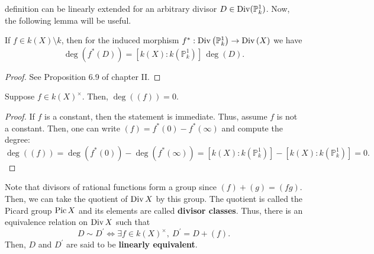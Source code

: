 definition can be linearly extended for an arbitrary divisor
$D\in\operatorname{Div}(\mathbb{P}^{1}_{k})$. Now, the following lemma will be useful.
\begin{lemm}\label{lemm:deg_of_induced}
  If $f\in k(X)\setminus k$, then for the induced morphism $f^{\ast}:\operatorname{Div}\left(
    \mathbb{P}^{1}_{k}\right)\to\operatorname{Div}\left(X\right)$ we have
  \[
    \deg\left(f^{\ast}(D)\right)=[k(X):k(\mathbb{P}^{1}_{k})]\,\deg(D).
  \]
\end{lemm}
\begin{proof} %
  See Proposition 6.9 of \cite{hartshorne} chapter II.
\end{proof}
\begin{cor}\label{cor:rational_deg_zero}
  Suppose $f\in k(X)^{\times}$. Then, $\deg\left((f)\right)=0$.
\end{cor}
\begin{proof}
  If $f$ is a constant, then the statement is immediate. Thus, assume
  $f$ is not a constant. Then, one can write
  $(f)=f^{\ast}(0)-f^{\ast}(\infty)$ and compute the degree:
  \[
    \deg\left((f)\right)=\deg(f^{\ast}(0))-\deg(f^{\ast}(\infty))
    =[k(X):k(\mathbb{P}^{1}_{k})]-[k(X):k(\mathbb{P}^{1}_{k})]=0.
  \]
\end{proof}
\begin{rem}
  Note that divisors of rational functions form a group since
  $(f)+(g)=(fg)$. Then, we can take the quotient of $\operatorname{Div} X$ by this group.
  The quotient is called the Picard group $\operatorname{Pic} X$ and its elements are
  called \textbf{divisor classes}. Thus, there is an equivalence relation on
  $\operatorname{Div} X$ such that
  \[
    D\sim D^{\prime}\iff \exists f\in k(X)^{\times},\ D^{\prime}=D+(f).
  \]
  Then, $D$ and $D^{\prime}$ are said to be \textbf{linearly equivalent}.
\end{rem}

